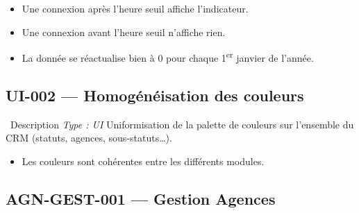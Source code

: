 \documentclass[12pt,a4paper]{article}
\newcommand{\checkmark}{\ding{51}}
\begin{document}
\begin{testbox}
\begin{itemize}[leftmargin=2em, itemsep=2pt]
    \item[\checkmark] Une connexion après l'heure seuil affiche l'indicateur.
    \item[\checkmark] Une connexion avant l'heure seuil n'affiche rien.
    \item[\checkmark] La donnée se réactualise bien à 0 pour chaque 1\textsuperscript{er} janvier de l'année.
\end{itemize}
\end{testbox}

\subsection{UI-002 — Homogénéisation des couleurs}
\label{subsec:ui-002}

\begin{featurebox}{\faPaintRoller\ Description \hfill \textit{Type : UI}}
Uniformisation de la palette de couleurs sur l'ensemble du CRM (statuts, agences, sous-statuts…).
\end{featurebox}

\begin{testbox}
\begin{itemize}[leftmargin=2em, itemsep=2pt]
    \item[\checkmark] Les couleurs sont cohérentes entre les différents modules.
\end{itemize}
\end{testbox}

\subsection{AGN-GEST-001 — Gestion Agences}
\label{subsec:agn-gest-001}
\end{document}

